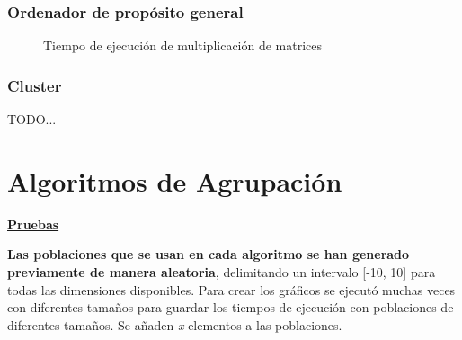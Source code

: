 		
	
		\subsubsection{Ordenador de propósito general}
		
		\begin{figure}[!h]
		\centering
		\caption{Tiempo de ejecución de multiplicación de matrices}
		\end{figure}
		
		\subsubsection{Cluster}

		\color{blue} TODO...
		
		\color{black}


\newpage


\section{Algoritmos de Agrupación}

	\begin{flushleft}
	\begin{mdframed}[roundcorner=5pt]		
		\textbf{\underline{Pruebas}}
		\vspace{0.1cm}
		
		\scriptsize	
		\textbf{Las poblaciones que se usan en cada algoritmo se han generado previamente de manera aleatoria}, delimitando un intervalo [-10, 10] para todas las dimensiones disponibles. Para crear los gráficos se ejecutó muchas veces con diferentes tamaños para guardar los tiempos de ejecución con poblaciones de diferentes tamaños. Se añaden \textit{x} elementos a las poblaciones.
		
		
	\end{mdframed}
	\end{flushleft}		

